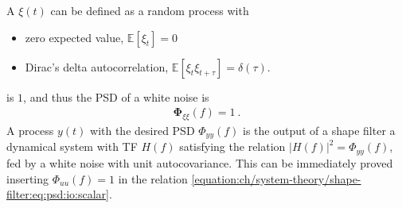 \documentclass[letterpaper,10pt,english]{jupyterBook}
\begin{document}
\sphinxAtStartPar
{}
A  \(\xi(t)\) can be defined as a random process with
\begin{itemize}
\item {} 
\sphinxAtStartPar
zero expected value, \(\mathbb{E}[\xi_t] = 0\)

\item {} 
\sphinxAtStartPar
Dirac’s delta auto\sphinxhyphen{}correlation, \(\mathbb{E}[\xi_t \xi_{t+\tau}] = \delta(\tau)\).

\end{itemize}

\sphinxAtStartPar
{\hyperref[\detokenize{ch/functional-analysis/dirac-delta:functional-analysis-dirac-delta}]{}} is \(1\), and thus the PSD of a white noise is
\begin{equation*}
\begin{split}\boldsymbol\Phi_{\xi \xi}(f) = 1 \ .\end{split}
\end{equation*}
\sphinxAtStartPar
{} A process \(y(t)\) with the desired PSD \(\Phi_{yy}(f)\) is the output of a shape filter \sphinxhyphen{} a dynamical system \sphinxhyphen{} with TF \(H(f)\) satisfying the relation \(|H(f)|^2 = \Phi_{yy}(f)\), fed by a white noise with unit autocovariance. This can be immediately proved inserting \(\Phi_{uu}(f) = 1\) in the relation \eqref{equation:ch/system-theory/shape-filter:eq:psd:io:scalar}.
\end{document}
